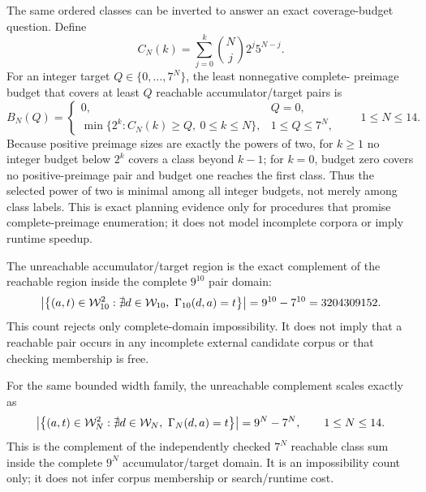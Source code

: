 \documentclass{article}
\begin{document}
The same ordered classes can be inverted to answer an exact coverage-budget
question. Define
\[
  C_N(k)=\sum_{j=0}^{k}\binom{N}{j}2^j5^{N-j}.
\]
For an integer target $Q\in\{0,\ldots,7^N\}$, the least nonnegative complete-
preimage budget that covers at least $Q$ reachable accumulator/target pairs is
\begin{equation}
  B_N(Q)=\begin{cases}
    0, & Q=0,\\
    \min\{2^k:C_N(k)\geq Q,\ 0\leq k\leq N\}, & 1\leq Q\leq7^N,
  \end{cases}
  \qquad 1\leq N\leq14.
  \label{eq:optimization-crazy-profile-minimum-coverage-budget}
\end{equation}
Because positive preimage sizes are exactly the powers of two, for $k\geq1$
no integer budget below $2^k$ covers a class beyond $k-1$; for $k=0$, budget
zero covers no positive-preimage pair and budget one reaches the first class.
Thus the selected power of two is minimal among all integer budgets, not merely
among class labels. This is exact planning evidence only for procedures that
promise complete-preimage enumeration; it does not model incomplete corpora or
imply runtime speedup.

The unreachable accumulator/target region is the exact complement of the
reachable region inside the complete $9^{10}$ pair domain:
\begin{equation}
  \left|\left\{(a,t)\in\mathcal{W}_{10}^{2}:
    \nexists d\in\mathcal{W}_{10},\ \Gamma_{10}\!\left(d,a\right)=t\right\}\right|
    =9^{10}-7^{10}=3204309152.
  \label{eq:optimization-crazy-unreachable-pair-count}
\end{equation}
This count rejects only complete-domain impossibility. It does not imply that a
reachable pair occurs in any incomplete external candidate corpus or that
checking membership is free.

For the same bounded width family, the unreachable complement scales exactly as
\begin{equation}
  \left|\left\{(a,t)\in\mathcal{W}_{N}^{2}:
    \nexists d\in\mathcal{W}_{N},\ \Gamma_{N}\!\left(d,a\right)=t\right\}\right|
    =9^N-7^N,\qquad 1\leq N\leq14.
  \label{eq:optimization-crazy-profile-unreachable-pair-count}
\end{equation}
This is the complement of the independently checked $7^N$ reachable class sum
inside the complete $9^N$ accumulator/target domain. It is an impossibility
count only; it does not infer corpus membership or search/runtime cost.
\end{document}
